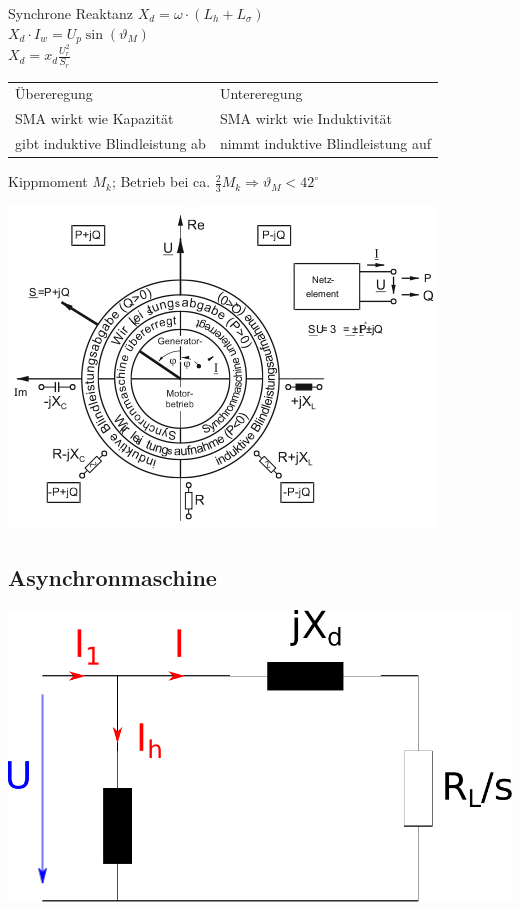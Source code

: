 \documentclass[fs, footer]{latex4ei}
\begin{document}
\begin{multicols}{4}
		Synchrone Reaktanz $X_d = \omega \cdot (L_h + L_\sigma)$\\
		$X_d \cdot I_w = U_p \sin(\vartheta_M)$\\
		$X_d = x_d \frac{U_r^2}{S_r}$ \\
		\begin{tabular}{ll}
			Übereregung & Untereregung\\ \mrule
			SMA wirkt wie Kapazität & SMA wirkt wie Induktivität\\
			gibt induktive Blindleistung ab & nimmt induktive Blindleistung auf\\
		\end{tabular}
		
		Kippmoment $M_k$; Betrieb bei ca. $\frac{2}{3} M_k \Rightarrow \vartheta_M < 42^\circ$\\
		
		\begin{center}
		\includegraphics[scale=.6]{./img/synchronmaschine_betriebsbereiche.jpg}
		\end{center}
		
		\subsection{Asynchronmaschine}
		
		\begin{center}
		\includegraphics[scale=.2]{./img/ersatzschaltbild_asynchronmaschine.pdf}
		\end{center}
		 

\end{multicols}
\end{document}
